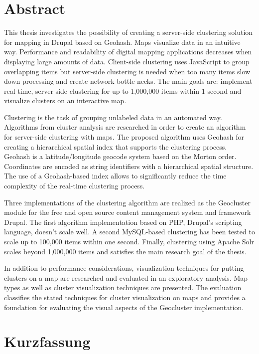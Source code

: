 
%
%


\chapter*{Abstract}

This thesis investigates the possibility of creating a server-side clustering solution for mapping in Drupal based on Geohash. Maps visualize data in an intuitive way. Performance and readability of digital mapping applications decreases when displaying large amounts of data. Client-side clustering uses JavaScript to group overlapping items but server-side clustering is needed when too many items slow down processing and create network bottle necks. The main goals are: implement real-time, server-side clustering for up to 1,000,000 items within 1 second and visualize clusters on an interactive map.

Clustering is the task of grouping unlabeled data in an automated way. Algorithms from cluster analysis are researched in order to create an algorithm for server-side clustering with maps. The proposed algorithm uses Geohash for creating a hierarchical spatial index that supports the clustering process. Geohash is a latitude/longitude geocode system based on the Morton order. Coordinates are encoded as string identifiers with a hierarchical spatial structure. The use of a Geohash-based index allows to significantly reduce the time complexity of the real-time clustering process.

Three implementations of the clustering algorithm are realized as the Geocluster module for the free and open source content management system and framework Drupal. The first algorithm implementation based on PHP, Drupal's scripting language, doesn't scale well. A second MySQL-based clustering has been tested to scale up to 100,000 items within one second. Finally, clustering using Apache Solr scales beyond 1,000,000 items and satisfies the main research goal of the thesis.

In addition to performance considerations, visualization techniques for putting clusters on a map are researched and evaluated in an exploratory analysis. Map types as well as cluster visualization techniques are presented. The evaluation classifies the stated techniques for cluster visualization on maps and provides a foundation for evaluating the visual aspects of the Geocluster implementation.

\newpage

\chapter*{Kurzfassung}


